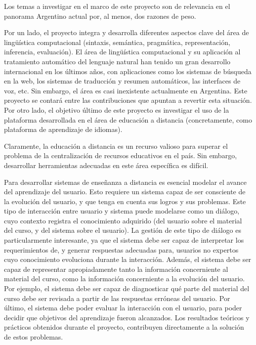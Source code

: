 
Los temas a investigar en el marco de este proyecto son de relevancia en el
panorama Argentino actual por, al menos, dos razones de peso.

Por un lado, el proyecto
integra y desarrolla diferentes aspectos clave del \'area de ling\"u\'istica
computacional (sintaxis, sem\'antica, pragm\'atica, representaci\'on,
inferencia, evaluaci\'on). El \'area de ling\"u\'istica computacional y su
aplicaci\'on al tratamiento autom\'atico del lenguaje natural han tenido un
gran desarrollo internacional en los \'ultimos a\~nos, con aplicaciones como los
sistemas de b\'usqueda en la web, los sistemas de traducci\'on y resumen
autom\'aticos, las interfaces de voz, etc. Sin embargo, el \'area es casi
inexistente actualmente en Argentina. Este proyecto se contar\'a entre 
las contribuciones que apuntan a revertir esta situaci\'on.
Por otro lado, el objetivo \'ultimo de este proyecto es investigar el uso de la plataforma
desarrollada en el \'area de educaci\'on a distancia (concretamente, como
plataforma de aprendizaje de idiomas).

Claramente, la educaci\'on a distancia es un recurso valioso para superar el 
problema de la centralizaci\'on de recursos
educativos en el pa\'is. Sin embargo, desarrollar herramientas adecuadas en
este \'area espec\'ifica es dif\'icil.

Para desarrollar sistemas de ense\~nanza a distancia es esencial modelar el
avance del aprendizaje del usuario. Esto requiere un sistema capaz de ser
consciente de la evoluci\'on del usuario, y que tenga en cuenta sus logros y sus
problemas. Este tipo de interacci\'on entre usuario y sistema puede modelarse
como un di\'alogo, cuyo contexto registra el conocimiento adquirido (del usuario
sobre el material del curso, y del sistema sobre el usuario). La gesti\'on de
este tipo de di\'alogo es particularmente interesante, ya que el sistema debe ser
capaz de interpretar los requerimientos de, y generar respuestas adecuadas para,
usuarios no expertos cuyo conocimiento evoluciona durante la interacci\'on.
Adem\'as, el sistema debe ser capaz de representar apropiadamente tanto la
informaci\'on concerniente al material del curso, como la informaci\'on
concerniente a la evoluci\'on del usuario. Por ejemplo, el sistema debe ser
capaz de diagnosticar qu\'e parte del material del curso debe ser revisada a
partir de las respuestas err\'oneas del usuario.  Por \'ultimo, el sistema debe
poder evaluar la interacci\'on con el usuario, para poder decidir
que objetivos del aprendizaje fueron alcanzados.
Los resultados te\'oricos y pr\'acticos obtenidos durante el proyecto,
contribuyen directamente a la soluci\'on de estos problemas.

